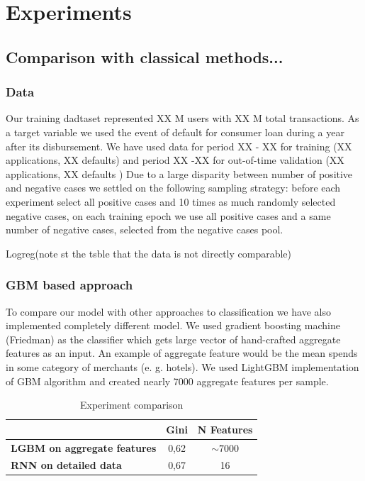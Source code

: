 \documentclass{sigkddExp}
\begin{document}
\section{Experiments}
\subsection{Comparison with classical methods...}
\subsubsection{Data}
Our training dadtaset represented XX M  users with XX M total transactions. As a target variable we used the event of default for consumer loan during a year after its disbursement. 
We have used data for period XX - XX for training  (XX applications, XX defaults) and period XX -XX for out-of-time validation (XX applications, XX defaults ) Due to a large disparity between number of positive and negative cases we settled on the following sampling strategy: before each experiment select all positive cases and 10 times as much randomly selected negative cases, on each training epoch we use all positive cases and a same number of negative cases, selected from the negative cases pool.

Logreg(note st the tsble that the data is not directly comparable)

\subsubsection{GBM based approach}

To compare our model with other approaches to classification we have also implemented completely different model. We used gradient boosting machine (Friedman\cite{friedman2001greedy}) as the classifier which gets large vector of hand-crafted aggregate features as an input. An example of aggregate feature would be the mean spends in some category of merchants (e. g. hotels).
We used LightGBM\cite{Ke2017LightGBMAH} implementation of GBM algorithm and created nearly 7000 aggregate features per sample.

\begin{table}
\caption{Experiment comparison}
\begin{tabular}{ | l | c | c | }
\hline
& \textbf{Gini} & \textbf{N Features} \\
\hline
\textbf{LGBM on aggregate features} & 0,62 & $\sim7000$ \\
\textbf{RNN on detailed data} & 0,67 & 16 \\
\hline
\end{tabular}
\label{tab2}
\end{table}
\end{document}
